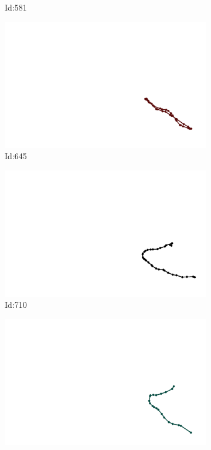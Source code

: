 \documentclass[12pt,twoside]{report}
\begin{document}
\begin{figure}
\begin{subfigure}[b]{0.20\textwidth}
\caption{Id:581}
\end{subfigure}
\begin{subfigure}[b]{0.20\textwidth}
\centering
\includegraphics[width=\textwidth]{../../trajectories/645.png}
\caption{Id:645}
\end{subfigure}
\begin{subfigure}[b]{0.20\textwidth}
\centering
\includegraphics[width=\textwidth]{../../trajectories/710.png}
\caption{Id:710}
\end{subfigure}
\begin{subfigure}[b]{0.20\textwidth}
\centering
\includegraphics[width=\textwidth]{../../trajectories/944.png}

\end{subfigure}
\end{figure}
\end{document}
